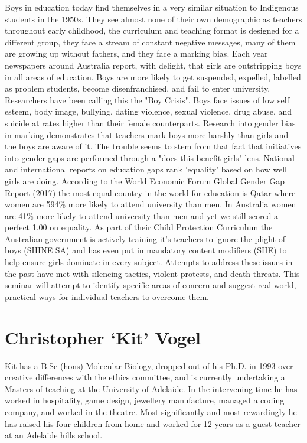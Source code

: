 \documentclass[twoside,14pt,a4paper,notitlepage]{memoir}
\begin{document}
Boys in education today find themselves in a very similar situation to Indigenous students in the 1950s. They see almost none of their own demographic as teachers throughout early childhood, the curriculum and teaching format is designed for a different group, they face a stream of constant negative messages, many of them are growing up without fathers, and they face a marking bias.
Each year newspapers around Australia report, with delight, that girls are outstripping boys in all areas of education. Boys are more likely to get suspended, expelled, labelled as problem students, become disenfranchised, and fail to enter university. Researchers have been calling this the "Boy Crisis".
Boys face issues of low self esteem, body image, bullying, dating violence, sexual violence, drug abuse, and suicide at rates higher than their female counterparts. Research into gender bias in marking demonstrates that teachers mark boys more harshly than girls and the boys are aware of it.
The trouble seems to stem from that fact that initiatives into gender gaps are performed through a "does-this-benefit-girls" lens. National and international reports on education gaps rank 'equality' based on how well girls are doing. According to the World Economic Forum Global Gender Gap Report (2017) the most equal country in the world for education is Qatar where women are 594\% more likely to attend university than men. In Australia women are 41\% more likely to attend university than men and yet we still scored a perfect 1.00 on equality.
As part of their Child Protection Curriculum the Australian government is actively training it's teachers to ignore the plight of boys (SHINE SA) and has even put in mandatory content modifiers (SHE) to help ensure girls dominate in every subject.
Attempts to address these issues in the past have met with silencing tactics, violent protests, and death threats.
This seminar will attempt to identify specific areas of concern and suggest real-world, practical ways for individual teachers to overcome them.

\section*{Christopher `Kit' Vogel}

Kit has a B.Sc (hons) Molecular Biology, dropped out of his Ph.D. in 1993 over creative differences with the ethics committee, and is currently undertaking a Masters of teaching at the University of Adelaide. In the intervening time he has worked in hospitality, game design, jewellery manufacture, managed a coding company, and worked in the theatre. Most significantly and most rewardingly he has raised his four children from home and worked for 12 years as a guest teacher at an Adelaide hills school.
\end{document}
